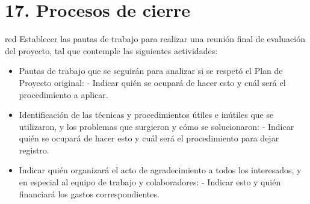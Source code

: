 \documentclass[11pt]{charter}
\begin{document}
\section{17. Procesos de cierre}    
\label{sec:cierre}

\begin{consigna}{red}
Establecer las pautas de trabajo para realizar una reunión final de evaluación del proyecto, tal que contemple las siguientes actividades:

\begin{itemize}
\item Pautas de trabajo que se seguirán para analizar si se respetó el Plan de Proyecto original:
 - Indicar quién se ocupará de hacer esto y cuál será el procedimiento a aplicar. 
\item Identificación de las técnicas y procedimientos útiles e inútiles que se utilizaron, y los problemas que surgieron y cómo se solucionaron:
 - Indicar quién se ocupará de hacer esto y cuál será el procedimiento para dejar registro.
\item Indicar quién organizará el acto de agradecimiento a todos los interesados, y en especial al equipo de trabajo y colaboradores:
  - Indicar esto y quién financiará los gastos correspondientes.
\end{itemize}

\end{consigna}
\end{document}
